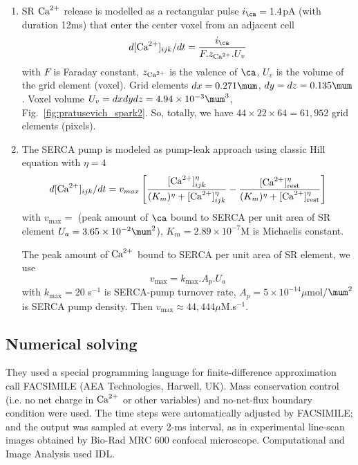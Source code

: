 \begin{enumerate}
\item SR ${\text{Ca}^{2+}}$ release is modelled as a rectangular pulse
  $i_\ca=1.4$pA (with duration 12ms) that enter the center voxel from
  an adjacent cell
  \begin{equation}
    \label{eq:1035}
    d[\Ca]_{ijk}/dt = \frac{i_\ca}{F.z_\Ca.U_v}
  \end{equation}
with $F$ is Faraday constant, $z_{\text{Ca}^{2+}}$ is the valence of $\ca$, $U_v$
is the volume of the grid element (voxel).
Grid elements $dx=0.271\mum$, $dy=dz=0.135\mum$. Voxel volume
$U_v=dxdydz=4.94\times 10^{-3}\mum^3$, Fig.~\ref{fig:pratusevich_spark2}. So,
totally, we have $44\times 22\times 64=61,952$ grid elements (pixels).

\item The SERCA pump is modeled as pump-leak approach using classic
  Hill equation with $\eta=4$
  \begin{equation}
    \label{eq:1037}
    d[{\text{Ca}^{2+}}]_{ijk}/dt =
    v_{max}\left[\frac{[{\text{Ca}^{2+}}]_{ijk}^\eta}{(K_m)^\eta+[{\text{Ca}^{2+}}]^\eta_{ijk}} - \frac{[{\text{Ca}^{2+}}]^\eta_{\text{rest}}}{(K_m)^\eta+[{\text{Ca}^{2+}}]^\eta_{\text{rest}}}\right]
  \end{equation}
  with $v_\max= $ (peak amount of $\ca$ bound to SERCA per unit area
  of SR element $U_a=3.65\times10^{-2}\mum^2$), $K_m=2.89\times10^{-7}$M is
  Michaelis constant.

  The peak amount of ${\text{Ca}^{2+}}$ bound to SERCA per unit area of SR element,
  we use
\begin{equation}
  \label{eq:1038}
  v_\max = k_\max.A_p.U_a
\end{equation}
with $k_\max=20$ s$^{-1}$ is SERCA-pump turnover rate, $A_p=5\times
10^{-14}\mu$mol/$\mum^2$ is SERCA pump density. Then $v_\max\approx
44,444\mu$M.s$^{-1}$.


\end{enumerate}


\subsection{Numerical solving}
\label{sec:numerical-solving}

They used a special programming language for finite-difference
approximation call FACSIMILE (AEA Technologies, Harwell,
UK). Mass conservation control (i.e. no net charge in ${\text{Ca}^{2+}}$ or other
variables) and no-net-flux boundary condition were used.  The time
steps were automatically adjusted by FACSIMILE; and the output was
sampled at every 2-ms interval, as in experimental line-scan images
obtained by Bio-Rad MRC 600 confocal microscope. Computational and Image
Analysis used IDL. 




